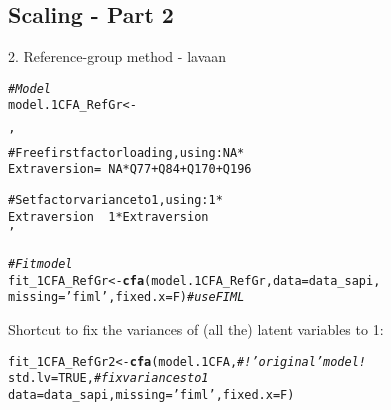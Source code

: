 \documentclass[10pt]{beamer}\usepackage[]{graphicx}\usepackage[]{xcolor}
\makeatletter
\newcommand{\hlnum}[1]{\textcolor[rgb]{0.686,0.059,0.569}{#1}}%
\newcommand{\hlsng}[1]{\textcolor[rgb]{0.192,0.494,0.8}{#1}}%
\newcommand{\hlcom}[1]{\textcolor[rgb]{0.678,0.584,0.686}{\textit{#1}}}%
\newcommand{\hldef}[1]{\textcolor[rgb]{0.345,0.345,0.345}{#1}}%
\newcommand{\hlkwb}[1]{\textcolor[rgb]{0.69,0.353,0.396}{#1}}%
\newcommand{\hlkwc}[1]{\textcolor[rgb]{0.333,0.667,0.333}{#1}}%
\newcommand{\hlkwd}[1]{\textcolor[rgb]{0.737,0.353,0.396}{\textbf{#1}}}%
\newenvironment{kframe}{%
 \def\at@end@of@kframe{}%
 \ifinner\ifhmode%
  \def\at@end@of@kframe{\end{minipage}}%
  \begin{minipage}{\columnwidth}%
 \fi\fi%
 \def\FrameCommand##1{\hskip\@totalleftmargin \hskip-\fboxsep
 \colorbox{shadecolor}{##1}\hskip-\fboxsep
     \hskip-\linewidth \hskip-\@totalleftmargin \hskip\columnwidth}%
 \MakeFramed {\advance\hsize-\width
   \@totalleftmargin\z@ \linewidth\hsize
   \@setminipage}}%
 {\par\unskip\endMakeFramed%
 \at@end@of@kframe}
\newenvironment{knitrout}{}{} %
\makeatother
\begin{document}
\subsection*{Scaling - Part 2}
%
\begin{frame}[fragile]{2. Reference-group method - lavaan}

\begin{knitrout}
\color{fgcolor}\begin{kframe}
\begin{alltt}
\hlcom{# Model}
\hldef{model.1CFA_RefGr} \hlkwb{<-} \hlsng{'
  # Free first factor loading, using: NA*
  Extraversion =~ NA*Q77 + Q84 + Q170 + Q196
  
  # Set factor variance to 1, using: 1*
  Extraversion ~~ 1*Extraversion
 '}

\hlcom{# Fit model}
\hldef{fit_1CFA_RefGr} \hlkwb{<-} \hlkwd{cfa}\hldef{(model.1CFA_RefGr,} \hlkwc{data}\hldef{=data_sapi,}
                \hlkwc{missing}\hldef{=}\hlsng{'fiml'}\hldef{,} \hlkwc{fixed.x}\hldef{=F)}  \hlcom{# use FIML}
\end{alltt}
\end{kframe}
\end{knitrout}

Shortcut to fix the variances of (all the) latent variables to 1:

\begin{knitrout}
\color{fgcolor}\begin{kframe}
\begin{alltt}
\hldef{fit_1CFA_RefGr2} \hlkwb{<-} \hlkwd{cfa}\hldef{(model.1CFA,}    \hlcom{# ! 'original' model !}
                       \hlkwc{std.lv} \hldef{=} \hlnum{TRUE}\hldef{,} \hlcom{# fix variances to 1}
                \hlkwc{data}\hldef{=data_sapi,} \hlkwc{missing}\hldef{=}\hlsng{'fiml'}\hldef{,} \hlkwc{fixed.x}\hldef{=F)}
\end{alltt}
\end{kframe}
\end{knitrout}


\end{frame}
\end{document}
